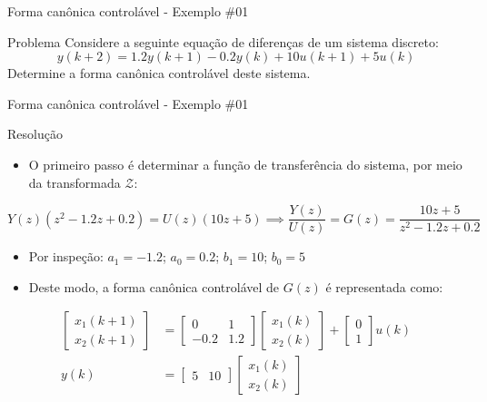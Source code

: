 \begin{frame}{Forma canônica controlável - Exemplo \#01}
\begin{block}{Problema}
Considere a seguinte equação de diferenças de um sistema discreto:
$$y(k+2) = \num{1,2}y(k+1) - \num{0,2}y(k) + 10u(k+1)+5u(k)$$
Determine a forma canônica controlável deste sistema.
\end{block}
\end{frame}

\begin{frame}{Forma canônica controlável - Exemplo \#01}
\begin{block}{Resolução}
\begin{itemize}
    \item O primeiro passo é determinar a função de transferência do sistema, por meio da transformada $\mathcal{Z}$:
\end{itemize}
$$Y(z)(z^2 - \num{1,2}z + \num{0,2}) = U(z)(10z + 5) \implies \dfrac{Y(z)}{U(z)} = G(z) = \dfrac{10z + 5}{z^2 - \num{1,2}z + \num{0,2}}$$
\begin{itemize}
    \item Por inspeção: $a_1 = - \num{1,2}$; $a_0 = \num{0,2}$; $b_1 = 10$; $b_0 = 5$
    \item Deste modo, a forma canônica controlável de $G(z)$ é representada como:
\end{itemize}
\begin{align*}
    \begin{bmatrix} x_1(k+1) \\ x_2(k+1) \end{bmatrix}
    &=
    \begin{bmatrix}
    0 & 1 \\ -\num{0,2} & \num{1,2}
    \end{bmatrix}
    \begin{bmatrix}
    x_1(k) \\ x_2(k)
    \end{bmatrix}
    +
    \begin{bmatrix}
    0 \\ 1
    \end{bmatrix}
    u(k) \\
    y(k)
    &=
    \begin{bmatrix}
    5 & 10
    \end{bmatrix}
    \begin{bmatrix}
    x_1(k) \\ x_2(k)
    \end{bmatrix}
\end{align*}
\end{block}
\end{frame}

